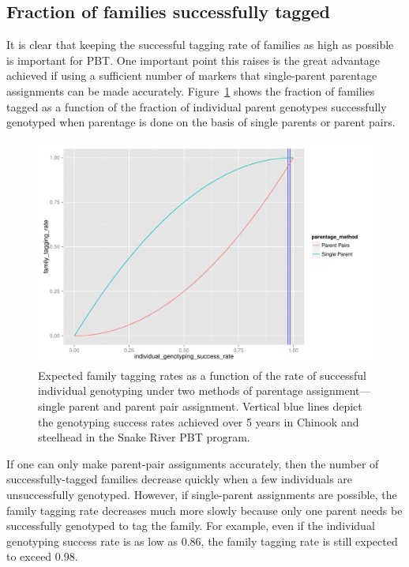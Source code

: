 \documentclass[11pt]{article}
\begin{document}
\subsection{Fraction of families successfully tagged}
It is clear that keeping the successful tagging rate of families as high as possible is important for PBT.  One important
point this raises is the great advantage achieved if using a sufficient number of markers that single-parent
parentage assignments can be made accurately.  Figure~\ref{fig:succ_rate} shows the fraction of families tagged as a 
function of the fraction of individual parent genotypes successfully genotyped when parentage is done on the basis
of single parents or parent pairs.  
\begin{figure}
\centering
\includegraphics[width = \textwidth]{images/succ_rate.pdf}
\caption{Expected family tagging rates as a function of the rate of successful individual genotyping
under two methods of parentage assignment---single parent and parent pair assignment.  Vertical blue lines
depict the genotyping success rates achieved over 5 years in Chinook and steelhead in the Snake River
PBT program.}
\label{fig:succ_rate}
\end{figure}

If one can only make parent-pair assignments accurately, then the number of successfully-tagged
families decrease quickly when a few individuals are unsuccessfully genotyped.  However, if single-parent assignments
are possible, the family tagging rate decreases much more  slowly because only one parent needs be successfully genotyped
to tag the family.  For example, even if the individual genotyping success rate is as low as 0.86, the family tagging rate
is still expected to exceed 0.98.  
\end{document}
